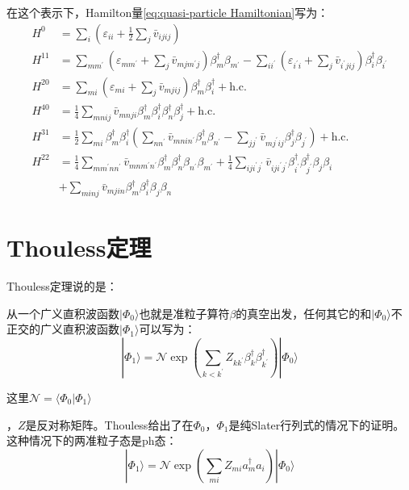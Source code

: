 在这个表示下，Hamilton量\ref{eq:quasi-particle Hamiltonian}写为：
\begin{align*}
H^{0} & =\sum_{i}(\varepsilon_{ii}+\frac{1}{2}\sum_{j}\bar{v}_{ijij})\\
H^{11} & =\sum_{mm^{\prime}}(\varepsilon_{mm^{\prime}}+\sum_{j}\bar{v}_{mjm^{\prime}j})\beta^{\dagger}_{m}\beta_{m^{\prime}}-\sum_{ii^{\prime}}(\varepsilon_{i^{\prime}i}+\sum_{j}\bar{v}_{i^{\prime}jij})\beta^{\dagger}_{i}\beta_{i^{\prime}}\\
H^{20} & =\sum_{mi}(\varepsilon_{mi}+\sum_{j}\bar{v}_{mjij})\beta^{\dagger}_{m}\beta^{\dagger}_{i}+\text{h.c.}\\
H^{40} & =\frac{1}{4}\sum_{mnij}\bar{v}_{mnji}\beta^{\dagger}_{m}\beta^{\dagger}_{i}\beta^{\dagger}_{n}\beta^{\dagger}_{j}+\text{h.c.}\\
H^{31} & =\frac{1}{2}\sum_{mi}\beta^{\dagger}_{m}\beta^{\dagger}_{i}(\sum_{nn^{\prime}}\bar{v}_{mnin^{\prime}}\beta^{\dagger}_{n}\beta_{n^{\prime}}-\sum_{jj^{\prime}}\bar{v}_{mj^{\prime}ij}\beta^{\dagger}_{j}\beta_{j^{\prime}})+\text{h.c.}\\
H^{22} & =\frac{1}{4}\sum_{mm^{\prime}nn^{\prime}}\bar{v}_{mnm^{\prime}n^{\prime}}\beta^{\dagger}_{m}\beta^{\dagger}_{n}\beta_{n^{\prime}}\beta_{m^{\prime}}+\frac{1}{4}\sum_{iji^{\prime}j^{\prime}}\bar{v}_{iji^{\prime}j^{\prime}}\beta^{\dagger}_{i^{\prime}}\beta^{\dagger}_{j^{\prime}}\beta_{j}\beta_{i}\\
 & +\sum_{minj}\bar{v}_{mjin}\beta^{\dagger}_{m}\beta^{\dagger}_{i}\beta_{j}\beta_{n}
\end{align*}


\section{Thouless定理}

Thouless定理\cite{Th60}说的是：

从一个广义直积波函数$|\Phi_{0}\rangle$也就是准粒子算符$\beta$的真空出发，任何其它的和$|\Phi_{0}\rangle$不正交的广义直积波函数$|\Phi_{1}\rangle$可以写为：
\begin{equation}
|\Phi_{1}\rangle=\mathcal{N}\exp\left(\sum_{k<k^{\prime}}Z_{kk^{\prime}}\beta^{\dagger}_{k}\beta^{\dagger}_{k^{\prime}}\right)|\Phi_{0}\rangle\label{eq:Thouless theorem}
\end{equation}

这里$\mathcal{N}=\langle\Phi_{0}|\Phi_{1}\rangle$

，$Z$是反对称矩阵。Thouless给出了在$\Phi_{0}$，$\Phi_{1}$是纯Slater行列式的情况下的证明。这种情况下的两准粒子态是ph态：
\[
|\Phi_{1}\rangle=\mathcal{N}\exp\left(\sum_{mi}Z_{mi}a^{\dagger}_{m}a_{i}\right)|\Phi_{0}\rangle
\]

